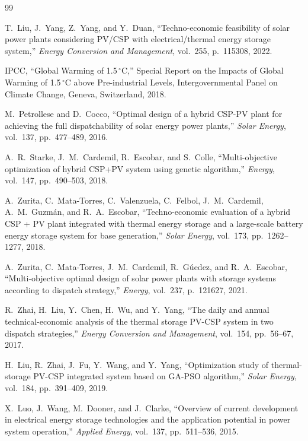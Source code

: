 \documentclass[journal]{IEEEtran}
\begin{document}
\begin{thebibliography}{99}

T.\ Liu, J.\ Yang, Z.\ Yang, and Y.\ Duan, ``Techno-economic feasibility of solar power plants considering PV/CSP with electrical/thermal energy storage system,'' \textit{Energy Conversion and Management}, vol.\ 255, p.\ 115308, 2022.

IPCC, ``Global Warming of 1.5\,$^\circ$C,'' Special Report on the Impacts of Global Warming of 1.5\,$^\circ$C above Pre-industrial Levels, Intergovernmental Panel on Climate Change, Geneva, Switzerland, 2018.

M.\ Petrollese and D.\ Cocco, ``Optimal design of a hybrid CSP-PV plant for achieving the full dispatchability of solar energy power plants,'' \textit{Solar Energy}, vol.\ 137, pp.\ 477--489, 2016.

A.\ R.\ Starke, J.\ M.\ Cardemil, R.\ Escobar, and S.\ Colle, ``Multi-objective optimization of hybrid CSP+PV system using genetic algorithm,'' \textit{Energy}, vol.\ 147, pp.\ 490--503, 2018.

A.\ Zurita, C.\ Mata-Torres, C.\ Valenzuela, C.\ Felbol, J.\ M.\ Cardemil, A.\ M.\ Guzm\'{a}n, and R.\ A.\ Escobar, ``Techno-economic evaluation of a hybrid CSP + PV plant integrated with thermal energy storage and a large-scale battery energy storage system for base generation,'' \textit{Solar Energy}, vol.\ 173, pp.\ 1262--1277, 2018.

A.\ Zurita, C.\ Mata-Torres, J.\ M.\ Cardemil, R.\ G\'{u}edez, and R.\ A.\ Escobar, ``Multi-objective optimal design of solar power plants with storage systems according to dispatch strategy,'' \textit{Energy}, vol.\ 237, p.\ 121627, 2021.

R.\ Zhai, H.\ Liu, Y.\ Chen, H.\ Wu, and Y.\ Yang, ``The daily and annual technical-economic analysis of the thermal storage PV-CSP system in two dispatch strategies,'' \textit{Energy Conversion and Management}, vol.\ 154, pp.\ 56--67, 2017.

H.\ Liu, R.\ Zhai, J.\ Fu, Y.\ Wang, and Y.\ Yang, ``Optimization study of thermal-storage PV-CSP integrated system based on GA-PSO algorithm,'' \textit{Solar Energy}, vol.\ 184, pp.\ 391--409, 2019.

X.\ Luo, J.\ Wang, M.\ Dooner, and J.\ Clarke, ``Overview of current development in electrical energy storage technologies and the application potential in power system operation,'' \textit{Applied Energy}, vol.\ 137, pp.\ 511--536, 2015.


\end{thebibliography}
\end{document}
